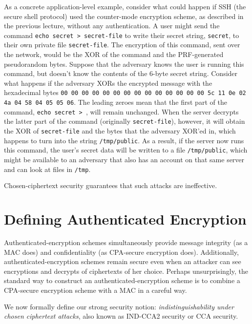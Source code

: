 As a concrete application-level example, consider what could
happen if SSH (the secure shell protocol) used the counter-mode
encryption scheme, as described in the previous lecture, without any
authentication.  A user might send the command
\texttt{echo secret > secret-file} to write their secret string,
\texttt{secret}, to their own private file \texttt{secret-file}.
The encryption of this command, sent over the network, would be the XOR
of the command and the PRF-generated pseudorandom bytes.  Suppose that
the adversary knows the user is running this command, but doesn't know
the contents of the 6-byte secret string.  Consider what
happens if the adversary XORs the encrypted message with the hexadecimal
bytes \texttt{00 00 00 00 00 00 00 00 00 00 00 00 00 00 5c 11 0e 02 4a
04 58 04 05 05 06}.  The leading zeroes mean that the first part of the
command, \texttt{echo secret > }, will remain unchanged.  When the server
decrypts the latter part of the command (originally \texttt{secret-file}),
however, it will obtain the XOR of \texttt{secret-file} and the bytes that
the adversary XOR'ed in, which happens to turn into the string \texttt{/tmp/public}.
As a result, if the server now runs this command, the user's secret data
will be written to a file \texttt{/tmp/public}, which might be available
to an adversary that also has an account on that same server and can look
at files in \texttt{/tmp}.

Chosen-ciphertext security guarantees that such attacks are ineffective.


\section{Defining Authenticated Encryption}

Authenticated-encryption schemes simultaneously provide message 
integrity (as a MAC does) and confidentiality (as CPA-secure encryption does).
Additionally, authenticated-encryption schemes remain secure even when 
an attacker can see encryptions and decrypts of ciphertexts of her choice.
Perhaps unsurprisingly, the standard way to construct an authenticated-encryption
scheme is to combine a CPA-secure encryption scheme with a MAC in a careful way.

We now formally define our strong security notion:
\emph{indistinguishability under chosen ciphertext attacks}, 
also known as IND-CCA2 security or CCA security.

